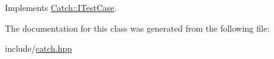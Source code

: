 Implements \hyperlink{structCatch_1_1ITestCase_a21ba9bd73bbf9c8e0384ed94d0f4cbb9}{Catch\-::\-I\-Test\-Case}.



The documentation for this class was generated from the following file\-:\begin{DoxyCompactItemize}
\item 
include/\hyperlink{catch_8hpp}{catch.\-hpp}\end{DoxyCompactItemize}

